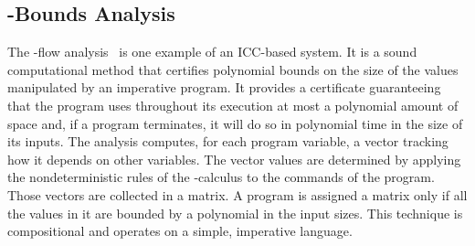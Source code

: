 \subsection{\mwp-Bounds Analysis}\label{subsec:mwp}

The \mwp-flow analysis~\cite{jones2009} is one example of an ICC-based system.
It is a sound computational method that certifies polynomial bounds on the size of the values manipulated by an imperative program.
It provides a certificate guaranteeing that the program uses throughout its execution at most a polynomial amount of space and, if a program terminates, it will do so in polynomial time in the size of its inputs.
The analysis computes, for each program variable, a vector tracking how it depends on other variables.
The vector values are determined by applying the nondeterministic rules of the \mwp-calculus to the commands of the program.
Those vectors are collected in a matrix.
A program is assigned a matrix only if all the values in it are bounded by a polynomial in the input sizes.
This technique is compositional and operates on a simple, imperative language.
